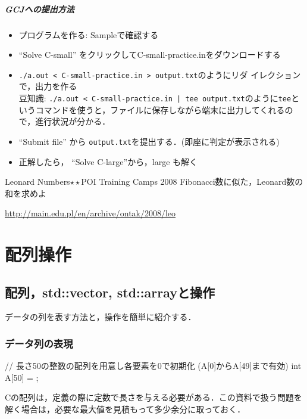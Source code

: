 \paragraph{GCJへの提出方法}
\begin{itemize}
\setlength{\itemsep}{0pt}
\item プログラムを作る: Sampleで確認する
\item ``Solve C-small'' をクリックしてC-small-practice.inをダウンロードする
\item \texttt{./a.out < C-small-practice.in > output.txt}のようにリダ
  イレクションで，出力を作る\\
 豆知識: \texttt{./a.out < C-small-practice.in | tee output.txt}のように\texttt{tee}というコマンドを使うと，ファイルに保存しながら端末に出力してくれるので，進行状況が分かる．
\item ``Submit file'' から \texttt{output.txt}を提出する．(即座に判定が表示される)
\item 正解したら， ``Solve C-large''から，large も解く
\end{itemize}


\begin{pbox}{Leonard Numbers$\star\star$}{POI Training Camps 2008}
Fibonacci数に似た，Leonard数の和を求めよ
  
\url{http://main.edu.pl/en/archive/ontak/2008/leo}
\end{pbox}

\chapter{配列操作}
\section{配列，std::vector, std::arrayと操作}

データの列を表す方法と，操作を簡単に紹介する．

\subsection{データ列の表現}

\begin{cbox}
  // 長さ50の整数の配列を用意し各要素を0で初期化 (A[0]からA[49]まで有効)
  int A[50] = {}; 
\end{cbox}

Cの配列は，定義の際に定数で長さを与える必要がある．この資料で扱う問題を解く場合は，必要な最大値を見積もって多少余分に取っておく．

